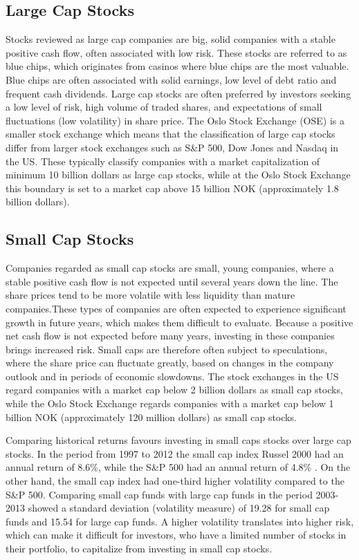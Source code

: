 \subsection{Large Cap Stocks}
Stocks reviewed as large cap companies are big, solid companies with a stable positive cash flow, often associated with low risk. These stocks are referred to as blue chips, which originates from casinos where blue chips are the most valuable. Blue chips are often associated with solid earnings, low level of debt ratio and frequent cash dividends. Large cap stocks are often preferred by investors seeking a low level of risk, high volume of traded shares, and expectations of small fluctuations (low volatility) in share price. The Oslo Stock Exchange (OSE) is a smaller stock exchange which means that the classification of large cap stocks differ from larger stock exchanges such as S\&P 500, Dow Jones and Nasdaq in the US. These typically classify companies with a market capitalization of minimum 10 billion dollars as large cap stocks, while at the Oslo Stock Exchange this boundary is set to a market cap above 15 billion NOK (approximately 1.8 billion dollars). 

\subsection{Small Cap Stocks}
Companies regarded as small cap stocks are small, young companies, where a stable positive cash flow is not expected until several years down the line. The share prices tend to be more volatile with less liquidity than mature companies.These types of companies are often expected to experience significant growth in future years, which makes them difficult to evaluate. Because a positive net cash flow is not expected before many years, investing in these companies brings increased risk. Small caps are therefore often subject to speculations, where the share price can fluctuate greatly, based on changes in the company outlook and in periods of economic slowdowns. The stock exchanges in the US regard companies with a market cap below 2 billion dollars as small cap stocks, while the Oslo Stock Exchange regards companies with a market cap below 1 billion NOK (approximately 120 million dollars) as small cap stocks.   

\indent\newline   
Comparing historical returns favours investing in small caps stocks over large cap stocks. In the period from 1997 to 2012 the small cap index Russel 2000 had an annual return of 8.6\%, while the S\&P 500 had an annual return of 4.8\% \cite{segal}. On the other hand, the small cap index had one-third higher volatility compared to the S\&P 500. Comparing small cap funds with large cap funds in the period 2003-2013 showed a standard deviation (volatility measure) of 19.28 for small cap funds and 15.54 for large cap funds. A higher volatility translates into higher risk, which can make it difficult for investors, who have a limited number of stocks in their portfolio, to capitalize from investing in small cap stocks.  

